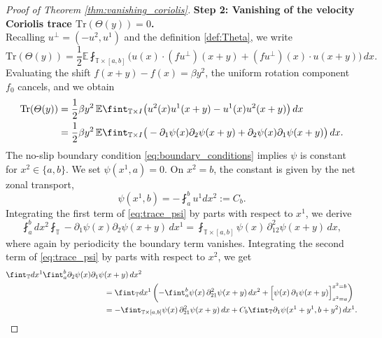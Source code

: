\documentclass[11pt,a4paper]{article}
\numberwithin{equation}{section}
\numberwithin{theorem}{section}
\numberwithin{remark}{section}
\numberwithin{definition}{section}
\begin{document}
\begin{proof}[Proof of Theorem \ref{thm:vanishing_coriolis}]
\noindent \textbf{Step 2: Vanishing of the velocity Coriolis trace $\text{Tr}(\varTheta(y))=0$.}\\
Recalling $u^\perp = (-u^2, u^1)$ and the definition \eqref{def:Theta}, we write
\begin{equation}
    \text{Tr}(\varTheta(y)) = \frac{1}{2}\mathbb{E} \fint_{\mathbb{T}\times [a,b]} \big(u(x) \cdot (fu^\perp)(x+y) + (f u^\perp)(x) \cdot u(x+y)\big)\, dx.
\end{equation}
Evaluating the shift $f(x+y) - f(x) = \beta y^2$, the uniform rotation component $f_0$ cancels, and we obtain
\begin{align}
    \text{Tr}(\varTheta(y)) &= \frac{1}{2}\beta y^2 \, \mathbb{E} \fint_{\mathbb{T} \times I} \big( u^2(x)u^1(x+y) - u^1(x)u^2(x+y) \big) \, dx\notag \\
    &= \frac{1}{2}\beta y^2 \, \mathbb{E} \fint_{\mathbb{T} \times I} \big( -\partial_1 \psi(x) \partial_2 \psi(x+y) + \partial_2 \psi(x) \partial_1 \psi(x+y) \big) \, dx.\label{eq:trace_psi}
\end{align}
The no-slip boundary condition \eqref{eq:boundary_conditions} implies $\psi$ is constant for $x^2\in \{a,b\}$. We set $\psi(x^1, a) = 0$. On $x^2=b$, the constant is given by the net zonal transport,
\begin{equation}
    \psi(x^1, b) = - \fint_a^b u^1 dx^2 := C_b.
\end{equation}
Integrating the first term of \eqref{eq:trace_psi} by parts with respect to $x^1$, we derive
\begin{equation}\label{eq:int1}
    \fint_a^b dx^2 \fint_{\mathbb{T}} -\partial_1 \psi (x)\partial_2 \psi(x+y) \, dx^1 = \fint_{\mathbb{T} \times [a, b]} \psi(x) \, \partial_{12}^2 \psi(x+y) \, dx,
\end{equation}
where again by periodicity the boundary term vanishes. Integrating the second term of \eqref{eq:trace_psi} by parts with respect to $x^2$, we get
\begin{align}
    \fint_{\mathbb{T}} dx^1 \fint_a^b \partial_2 \psi(x) \partial_1\psi&(x+y) \, dx^2 \label{eq:int2}\\
    &= \fint_{\mathbb{T}} dx^1 \left( - \fint_a^b \psi(x) \, \partial_{21}^2 \psi(x+y) \, dx^2 + \Big[ \psi(x) \, \partial_1 \psi(x+y) \Big]_{x^2=a}^{x^2=b} \right)\notag \\
    &= - \fint_{\mathbb{T} \times [a, b]} \psi(x) \, \partial_{21}^2 \psi(x+y) \, dx + C_b \fint_{\mathbb{T}} \partial_1 \psi(x^1+y^1, b+y^2) \, dx^1.\notag
\end{align}

\end{proof}
\end{document}
